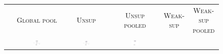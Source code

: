 \begin{figure}[tbhp]
	\newcommand{\imgwidth}{0.17\textwidth}
	\begin{center}
		\small
		\setlength{\tabcolsep}{3pt}
		\begin{tabular}{cccccc}
			& \small \textsc{Global pool} & \small \textsc{Unsup} & \small \textsc{Unsup pooled} & \small \textsc{Weak-sup} &  \small \textsc{Weak-sup pooled} \\
			\rotatebox[origin=c]{90}{\small \collab$_{35}$} &
			{\includegraphics[width=\imgwidth, align=c, trim={0 0 0 0}, clip]{collab/56_96_32nodes_0_0_global.pdf}} &
			{\includegraphics[width=\imgwidth, align=c, trim={0 0 0 0}, clip]{collab/56_96_32nodes_0_1_unsup.pdf}} &
			{\includegraphics[width=\imgwidth, align=c, trim={0 0 0 0}, clip]{collab/56_96_21nodes_0_1_unsup_pooled.pdf}} &

\end{tabular}
\end{center}
\end{figure}
